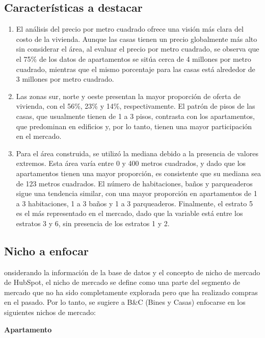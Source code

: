\documentclass[conference,final,]{IEEEtran}
\begin{document}
\subsection{\textbf{Características a destacar}}

\begin{enumerate}
\def\labelenumi{\arabic{enumi}.}
\item
  El análisis del precio por metro cuadrado ofrece una visión más clara
  del costo de la vivienda. Aunque las casas tienen un precio
  globalmente más alto sin considerar el área, al evaluar el precio por
  metro cuadrado, se observa que el 75\% de los datos de apartamentos se
  sitúa cerca de 4 millones por metro cuadrado, mientras que el mismo
  porcentaje para las casas está alrededor de 3 millones por metro
  cuadrado.
\item
  Las zonas sur, norte y oeste presentan la mayor proporción de oferta
  de vivienda, con el 56\%, 23\% y 14\%, respectivamente. El patrón de
  pisos de las casas, que usualmente tienen de 1 a 3 pisos, contrasta
  con los apartamentos, que predominan en edificios y, por lo tanto,
  tienen una mayor participación en el mercado.
\item
  Para el área construida, se utilizó la mediana debido a la presencia
  de valores extremos. Esta área varía entre 0 y 400 metros cuadrados, y
  dado que los apartamentos tienen una mayor proporción, es consistente
  que su mediana sea de 123 metros cuadrados. El número de habitaciones,
  baños y parqueaderos sigue una tendencia similar, con una mayor
  proporción en apartamentos de 1 a 3 habitaciones, 1 a 3 baños y 1 a 3
  parqueaderos. Finalmente, el estrato 5 es el más representado en el
  mercado, dado que la variable está entre los estratos 3 y 6, sin
  presencia de los estratos 1 y 2.
\end{enumerate}

\subsection{\textbf{Nicho a enfocar}}

onsiderando la información de la base de datos y el concepto de nicho de
mercado de HubSpot, el nicho de mercado se define como una parte del
segmento de mercado que no ha sido completamente explorada pero que ha
realizado compras en el pasado. Por lo tanto, se sugiere a B\&C (Bines y
Casas) enfocarse en los siguientes nichos de mercado:

\textbf{Apartamento}
\end{document}

